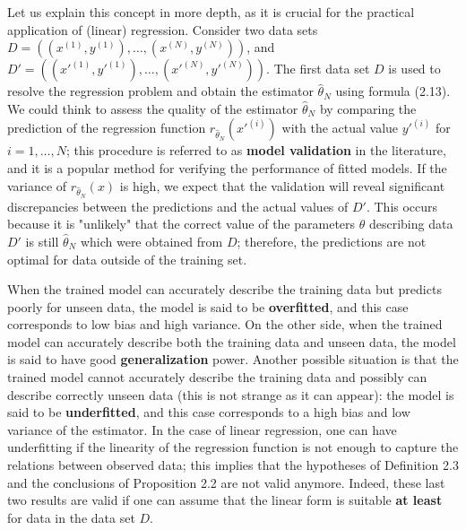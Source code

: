 \documentclass{report}
\begin{document}
Let us explain this concept in more depth, as it is crucial for the practical application of (linear) regression. Consider two data sets $D = ((x^{(1)},y^{(1)}),\dots,(x^{(N)},y^{(N)}))$, and $D' = ((x'^{(1)},y'^{(1)}),\dots,(x'^{(N)},y'^{(N)}))$. The first data set $D$ is used to resolve the regression problem and obtain the estimator $\hat{\theta}_N$ using formula (2.13). We could think to assess the quality of the estimator $\hat{\theta}_N$ by comparing the prediction of the regression function $r_{\hat{\theta}_N}(x'^{(i)})$ with the actual value $y'^{(i)}$ for $i = 1,\dots,N$; this procedure is referred to as \textbf{model validation} in the literature, and it is a popular method for verifying the performance of fitted models. If the variance of $r_{\hat{\theta}_N}(x)$ is high, we expect that the validation will reveal significant discrepancies between the predictions and the actual values of $D'$. This occurs because it is "unlikely" that the correct value of the parameters $\theta$ describing data $D'$ is still $\hat{\theta}_N$ which were obtained from $D$; therefore, the predictions are not optimal for data outside of the training set.

When the trained model can accurately describe the training data but predicts poorly for unseen data, the model is said to be \textbf{overfitted}, and this case corresponds to low bias and high variance. On the other side, when the trained model can accurately describe both the training data and unseen data, the model is said to have good \textbf{generalization} power. Another possible situation is that the trained model cannot accurately describe the training data and possibly can describe correctly unseen data (this is not strange as it can appear): the model is said to be \textbf{underfitted}, and this case corresponds to a high bias and low variance of the estimator. In the case of linear regression, one can have underfitting if the linearity of the regression function is not enough to capture the relations between observed data; this implies that the hypotheses of Definition 2.3 and the conclusions of Proposition 2.2 are not valid anymore. Indeed, these last two results are valid if one can assume that the linear form is suitable \textbf{at least} for data in the data set $D$.
\end{document}
